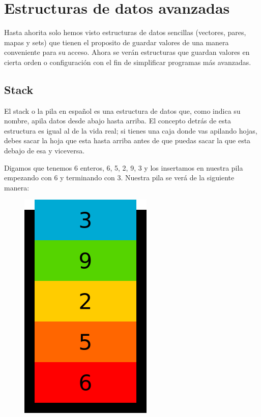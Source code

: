 \documentclass{article}
\begin{document}
\section{Estructuras de datos avanzadas}

Hasta ahorita solo hemos visto estructuras de datos sencillas (vectores, pares, mapas y sets) que tienen el proposito de guardar valores de una manera conveniente para su acceso. Ahora se verán estructuras que guardan valores en cierta orden o configuración con el fin de simplificar programas más avanzadas.

\subsection{Stack}

El stack o la pila en español es una estructura de datos que, como indica su nombre, apila datos desde abajo hasta arriba. El concepto detrás de esta estructura es igual al de la vida real; si tienes una caja donde vas apilando hojas, debes sacar la hoja que esta hasta arriba antes de que puedas sacar la que esta debajo de esa y viceversa.

Digamos que tenemos 6 enteros, {6, 5, 2, 9, 3} y los insertamos en nuestra pila empezando con 6 y terminando con 3. Nuestra pila se verá de la siguiente manera:

\begin{figure}[H]
    \centering
    \includegraphics[width=0.1\paperwidth]{pila}
\end{figure}
\end{document}
